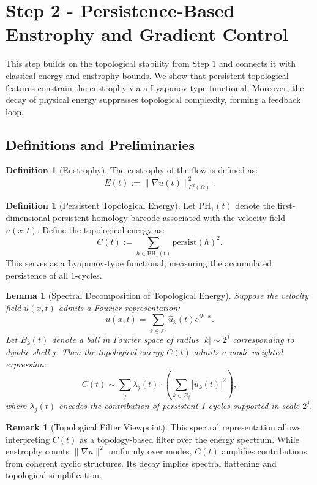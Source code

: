 \documentclass[11pt]{article}
\newtheorem{lemma}[theorem]{Lemma}
\theoremstyle{definition}
\newtheorem{definition}[theorem]{Definition}
\newtheorem{remark}[theorem]{Remark}
\begin{document}
\section{Step 2 - Persistence-Based Enstrophy and Gradient Control}

This step builds on the topological stability from Step 1 and connects it with classical energy and enstrophy bounds. We show that persistent topological features constrain the enstrophy via a Lyapunov-type functional. Moreover, the decay of physical energy suppresses topological complexity, forming a feedback loop.

\subsection{Definitions and Preliminaries}

\begin{definition}[Enstrophy]
The enstrophy of the flow is defined as:
\[
E(t) := \|\nabla u(t)\|_{L^2(\Omega)}^2.
\]
\end{definition}

\begin{definition}[Persistent Topological Energy]
Let $\mathrm{PH}_1(t)$ denote the first-dimensional persistent homology barcode associated with the velocity field $u(x,t)$. Define the topological energy as:
\[
C(t) := \sum_{h \in \mathrm{PH}_1(t)} \mathrm{persist}(h)^2.
\]
This serves as a Lyapunov-type functional, measuring the accumulated persistence of all $1$-cycles.
\end{definition}

\begin{lemma}[Spectral Decomposition of Topological Energy]
Suppose the velocity field $u(x,t)$ admits a Fourier representation:
\[
u(x,t) = \sum_{k \in \mathbb{Z}^3} \hat{u}_k(t) e^{i k \cdot x}.
\]
Let $B_k(t)$ denote a ball in Fourier space of radius $|k| \sim 2^j$ corresponding to dyadic shell $j$. Then the topological energy $C(t)$ admits a mode-weighted expression:
\[
C(t) \sim \sum_{j} \lambda_j(t) \cdot \left(\sum_{k \in B_j} |\hat{u}_k(t)|^2\right),
\]
where $\lambda_j(t)$ encodes the contribution of persistent 1-cycles supported in scale $2^j$.
\end{lemma}

\begin{remark}[Topological Filter Viewpoint]
This spectral representation allows interpreting $C(t)$ as a topology-based filter over the energy spectrum. While enstrophy counts $\|\nabla u\|^2$ uniformly over modes, $C(t)$ amplifies contributions from coherent cyclic structures. Its decay implies spectral flattening and topological simplification.
\end{remark}
\end{document}
